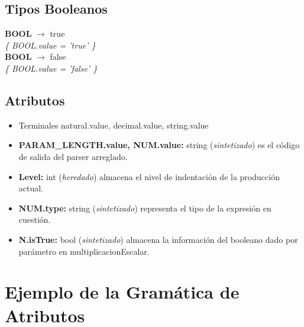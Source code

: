 \documentclass[10pt,a4paper]{article}
\begin{document}
\subsection{Tipos Booleanos}
\textbf{BOOL} $\rightarrow$ true \\
\textit{\{ BOOL.value = 'true' \}} \\ 

\textbf{BOOL} $\rightarrow$ false \\
\textit{\{ BOOL.value = 'false' \}} \\ 


\subsection{Atributos}

\begin{itemize}
\item Terminales natural.value, decimal.value, string.value
\item \textbf{PARAM\_LENGTH.value, NUM.value:} string (\textit{sintetizado}) es el código de salida del parser arreglado.
\item \textbf{Level:} int (\textit{heredado}) almacena el nivel de indentación de la producción actual.
\item \textbf{NUM.type:} string (\textit{sintetizado}) representa el tipo de la expresión en cuestión.
\item \textbf{N.isTrue:} bool (\textit{sintetizado}) almacena la información del booleano dado por parámetro en multiplicacionEscalar.
\end{itemize}

\section{Ejemplo de la Gramática de Atributos}
\end{document}
